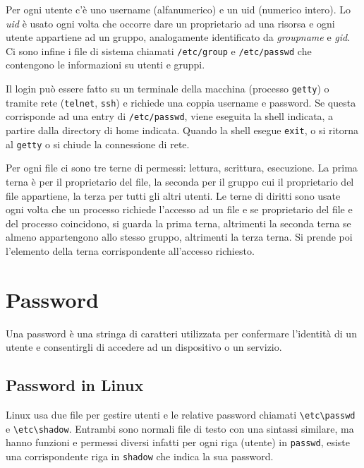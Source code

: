 Per ogni utente c'è uno username (alfanumerico) e un uid (numerico intero). Lo \textit{uid} è usato ogni volta che occorre dare un proprietario ad una risorsa e ogni utente appartiene ad un gruppo, analogamente identificato da \textit{groupname} e \textit{gid}. Ci sono infine i file di sistema chiamati \verb|/etc/group| e \verb|/etc/passwd| che contengono le informazioni su utenti e gruppi.

Il login può essere fatto su un terminale della macchina (processo \verb|getty|) o tramite rete (\verb|telnet|, \verb|ssh|) e richiede una coppia username e password. Se questa corrisponde ad una entry di \verb|/etc/passwd|, viene eseguita la shell indicata, a partire dalla directory di home indicata. Quando la shell esegue \verb|exit|, o si ritorna al \verb|getty| o si chiude la connessione di rete.

Per ogni file ci sono tre terne di permessi: lettura, scrittura, esecuzione. La prima terna è per il proprietario del file, la seconda per il gruppo cui il proprietario del file appartiene, la terza per tutti gli altri utenti. Le terne di diritti sono usate ogni volta che un processo richiede l'accesso ad un file e se proprietario del file e del processo coincidono, si guarda la prima terna, altrimenti la seconda terna se almeno appartengono allo stesso gruppo, altrimenti la terza terna. Si prende poi l'elemento della terna corrispondente all'accesso richiesto.

\section{Password}
Una password è una stringa di caratteri utilizzata per confermare l'identità di un utente e consentirgli di accedere ad un dispositivo o un servizio.

\subsection*{Password in Linux}
Linux usa due file per gestire utenti e le relative password chiamati \verb|\etc\passwd| e \verb|\etc\shadow|. Entrambi sono normali file di testo con una sintassi similare, ma hanno funzioni e permessi diversi infatti per ogni riga (utente) in \verb|passwd|, esiste una corrispondente riga in \verb|shadow| che indica la sua password.

